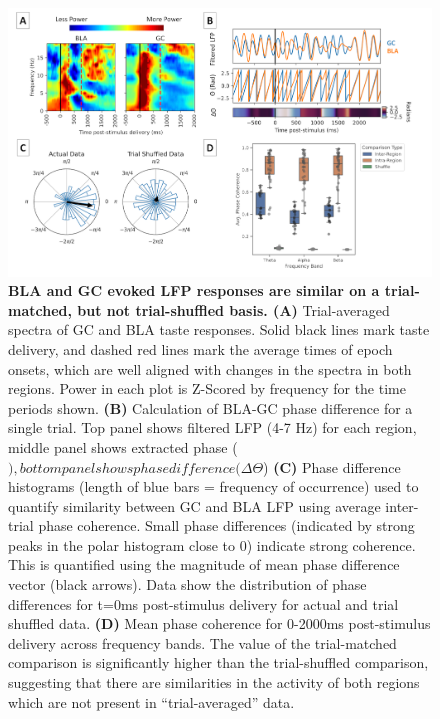\begin{refsection}
\begin{figure}
\includegraphics[width=\linewidth]{mahmood_22_figures/fig7-0.png}
\caption{\textbf{BLA and GC evoked LFP responses are similar on a trial-matched, but not trial-shuffled basis. (A)} Trial-averaged spectra of GC and BLA taste responses. Solid black lines mark taste delivery, and dashed red lines mark the average times of epoch onsets, which are well aligned with changes in the spectra in both regions. Power in each plot is Z-Scored by frequency for the time periods shown. \textbf{(B)} Calculation of BLA-GC phase difference for a single trial. Top panel shows filtered LFP (4-7 Hz) for each region, middle panel shows extracted phase (\Theta$), bottom panel shows phase difference (\Delta\Theta$) \textbf{(C)} Phase difference histograms (length of blue bars = frequency of occurrence) used to quantify similarity between GC and BLA LFP using average inter-trial phase coherence. Small phase differences (indicated by strong peaks in the polar histogram close to 0) indicate strong coherence. This is quantified using the magnitude of mean phase difference vector (black arrows). Data show the  distribution of phase differences for t=0ms post-stimulus delivery for actual and trial shuffled data. \textbf{(D)} Mean phase coherence for 0-2000ms post-stimulus delivery across frequency bands. The value of the trial-matched comparison is significantly higher than the trial-shuffled comparison, suggesting that there are similarities in the activity of both regions which are not present in “trial-averaged” data.}
\label{fig:wrapfig}
\end{figure}


\end{refsection}
